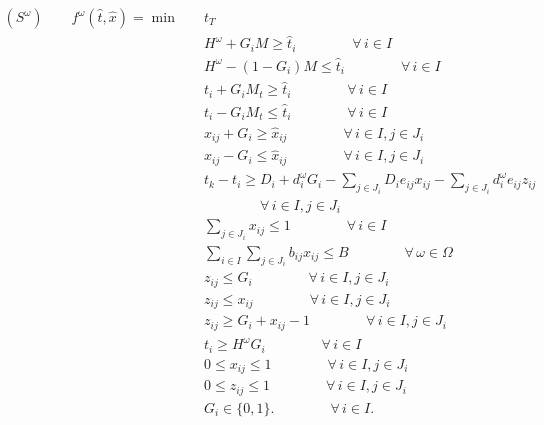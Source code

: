 \documentclass[11pt]{article}
\begin{document}
	\begin{subequations}
		\label{prob:subOri}
		\begin{align}
		(S^\omega) \qquad f^\omega(\hat{t},\hat{x}) = \min \quad & t_T \\
		& H^\omega + G_i M \geq \hat{t}_i \qquad \qquad \forall \,i \in I \label{cons:sG1}\\
		& H^\omega - (1 - G_i) M \leq \hat{t}_i \qquad \qquad \forall \,i \in I \label{cons:sG2}\\
		& t_i + G_i M_t \geq \hat{t}_i \qquad \qquad \forall \,i \in I \label{cons:stG1}\\
		& t_i - G_i M_t \leq \hat{t}_i \qquad \qquad \forall \,i \in I \label{cons:stG2}\\
		& x_{ij} + G_i \geq \hat{x}_{ij} \qquad \qquad \forall \,i \in I, j \in J_i \label{cons:sxG1}\\
		& x_{ij} - G_i \leq \hat{x}_{ij} \qquad \qquad \forall \,i \in I, j \in J_i \label{cons:sxG2}\\
		& t_k - t_i \geq D_i + d_i^\omega G_i -\sum_{j \in J_i} D_i e_{ij} x_{ij} - \sum_{j \in J_i} d_i^\omega e_{ij} z_{ij} \nonumber \\ 
		& \qquad \qquad \forall \,i \in I, j \in J_i \label{cons:subSep}\\
		& \sum_{j \in J_i} x_{ij} \leq 1 \qquad \qquad \forall \,i \in I \label{cons:subBudget1}\\
		& \sum_{i \in I}\sum_{j \in J_i} b_{ij}x_{ij} \leq B \qquad \qquad \forall \,\omega \in \Omega \label{cons:subBudget}\\
		& z_{ij} \leq G_i \qquad \qquad \forall \,i \in I, j \in J_i \label{cons:sublinearize1}\\
		& z_{ij} \leq x_{ij} \qquad \qquad \forall \,i \in I, j \in J_i \label{cons:sublinearize2}\\
		& z_{ij} \geq G_i + x_{ij} - 1 \qquad \qquad \forall \,i \in I, j \in J_i \label{cons:sublinearize3}\\
		& t_i \geq H^\omega G_i \qquad \qquad \forall\, i \in I \label{cons:subH}\\
		& 0 \leq x_{ij} \leq 1 \qquad \qquad \forall \,i \in I, j \in J_i\\
		& 0 \leq z_{ij} \leq 1 \qquad \qquad \forall \,i \in I, j \in J_i\\
		& G_i \in \{0,1\}. \qquad \qquad \forall \,i \in I. \label{cons:subInt}
		\end{align}
	\end{subequations}
\end{document}
